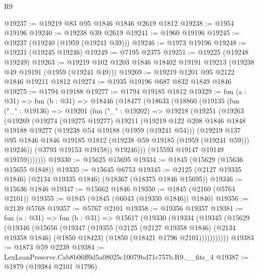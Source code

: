 \begin{lexlean}{R9}
\begin{coremodule}
@19237 := @19219 @83 @95 @1846 @1846 @2619 @1812
@19238 := @1954 @19196
@19240 := @19238 @39 @2619
@19241 := @1960 @19196
@19245 := @19237 (@19240 (@1959 (@19241 @39)))
@19246 := @1973 @19196
@19248 := @19231 (@19245 @19246)
@19249 := @7195 @2375
@19251 := @19225 (@19248 @19249)
@19263 := @19219 @102 @1203 @1846 @18402 @19191 @19213 (@19238 @49 @19191 (@1959 (@19241 @49)))
@19269 := @19219 @1201 @95 @2122 @1846 @19211 @1812
@19274 := @1935 @19196 @687 @832 @1849 @1846
@19275 := @1794 @19188
@19277 := @1794 @19185 @1812
@19329 := fun (a : @31) =>
  fun (b : @31) =>
  @18446
    (@18477
      (@18633
        (@18860
          (@19135
            (fun ("_" : @19136) =>
            @19201
              (fun ("_" : @19202) =>
              @19218
                (@19251
                  (@19263
                    (@19269
                      (@19274
                        (@19275 @19277)
                        @19211
                        (@19219
                          @122
                          @208
                          @1846
                          @1848
                          @19188
                          @19277
                          (@19238 @54 @19188 (@1959 (@19241 @54)))
                          (@19219
                            @137
                            @95
                            @1846
                            @1846
                            @19185
                            @1812
                            (@19238 @59 @19185 (@1959 (@19241 @59)))
                            @19246))
                        (@3793 @19153 @19158))
                      @19246)))
                (@15593 @19147 @19149 @19159)))))))
@19330 := @15625 @15695
@19334 := @1845 (@15629 (@15636 @15655 @1848))
@19335 := @15645 @6753
@19345 := @2125 (@2127 @19335 @1846) (@2134 @19335 @1846) (@18367 (@18375 @1846 @15695))
@19346 := @15636 @1846
@19347 := @15662 @1846
@19350 := @1845 (@2160 (@5764 @2101))
@19355 := @1845 (@1845 (@6043 (@19350 @1846)) @1846)
@19356 := @2139 @5768
@19357 := @5767 @2101
@19358 := @19356 @19357
@19381 := fun (a : @31) =>
  fun (b : @31) =>
  @15617
    (@19330
      (@19334
        (@19345
          (@15629
            (@19346
              (@15656
                (@19347
                  (@19355
                    (@2125
                      (@2127 @19358 @1846)
                      (@2134 @19358 @1846)
                      (@1850 @18423)
                      (@1850 (@18421 @1796 @2101)))))))))))
@19383 := @1873 @59 @2239
@19384 := LexLeanPreserve.Cab8b06ff0d5a08025c10079bd71c757b.R9.__fits_4
@19387 := @1879 (@19384 @2101 @1796)

\end{coremodule}
\end{lexlean}
